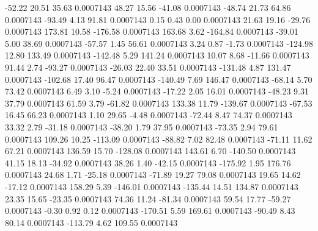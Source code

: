       -52.22       20.51       35.63     0.0007143
       48.27       15.56      -41.08     0.0007143
      -48.74       21.73       64.86     0.0007143
      -93.49        4.13       91.81     0.0007143
        0.15        0.43        0.00     0.0007143
       21.63       19.16      -29.76     0.0007143
      173.81       10.58     -176.58     0.0007143
      163.68        3.62     -164.84     0.0007143
      -39.01        5.00       38.69     0.0007143
      -57.57        1.45       56.61     0.0007143
        3.24        0.87       -1.73     0.0007143
     -124.98       12.80      133.49     0.0007143
     -142.48        5.29      141.24     0.0007143
       10.07        8.68      -11.66     0.0007143
       91.44        2.74      -93.27     0.0007143
      -26.03       22.40       33.51     0.0007143
     -131.48        4.87      131.47     0.0007143
     -102.68       17.40       96.47     0.0007143
     -140.49        7.69      146.47     0.0007143
      -68.14        5.70       73.42     0.0007143
        6.49        3.10       -5.24     0.0007143
      -17.22        2.05       16.01     0.0007143
      -48.23        9.31       37.79     0.0007143
       61.59        3.79      -61.82     0.0007143
      133.38       11.79     -139.67     0.0007143
      -67.53       16.45       66.23     0.0007143
        1.10       29.65       -4.48     0.0007143
      -72.44        8.47       74.37     0.0007143
       33.32        2.79      -31.18     0.0007143
      -38.20        1.79       37.95     0.0007143
      -73.35        2.94       79.61     0.0007143
      109.26       10.25     -113.09     0.0007143
      -88.82        7.02       82.48     0.0007143
      -71.11       11.62       67.21     0.0007143
      136.59       15.70     -128.08     0.0007143
      143.61        6.70     -140.50     0.0007143
       41.15       18.13      -34.92     0.0007143
       38.26        1.40      -42.15     0.0007143
     -175.92        1.95      176.76     0.0007143
       24.68        1.71      -25.18     0.0007143
      -71.89       19.27       79.08     0.0007143
       19.65       14.62      -17.12     0.0007143
      158.29        5.39     -146.01     0.0007143
     -135.44       14.51      134.87     0.0007143
       23.35       15.65      -23.35     0.0007143
       74.36       11.24      -81.34     0.0007143
       59.54       17.77      -59.27     0.0007143
       -0.30        0.92        0.12     0.0007143
     -170.51        5.59      169.61     0.0007143
      -90.49        8.43       80.14     0.0007143
     -113.79        4.62      109.55     0.0007143
